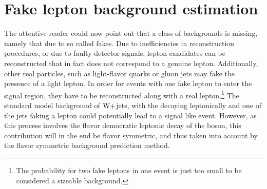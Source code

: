 \section{Fake lepton background estimation}
\noindent\justify
The attentive reader could now point out that a class of backgrounds is missing, namely that due to so called fakes. 
Due to inefficiencies in reconstruction procedures, or due to faulty detector signals, lepton candidates can be reconstructed that in fact does not correspond to a genuine lepton. 
Additionally, other real particles, such as light-flavor quarks or gluon jets may fake the presence of a light lepton. 
In order for events with one fake lepton to enter the signal region, they have to be reconstructed along with a real lepton.\footnote{The probability for two fake leptons in one event is just too small to be considered a sizeable background.}
The standard model background of $\mathrm{W}+$jets, with the \PW decaying leptonically and one of the jets faking a lepton could potentially lead to a signal like event. 
However, as this process involves the flavor democratic leptonic decay of the \PW boson, this contribution will in the end be flavor symmetric, and thus taken into account by the flavor symmetric background prediction method.  
